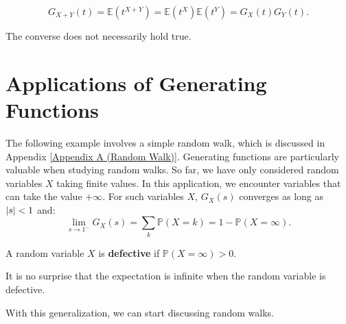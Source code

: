 \documentclass{huhtakm-template-book-v2}
\newcommand{\prob}{\mathbb{P}}
\newcommand{\expect}{\mathbb{E}}
\begin{document}
    \begin{proofing}
        \begin{equation*}
            G_{X+Y}(t) = \expect(t^{X+Y}) = \expect(t^{X})\expect(t^{Y}) = G_{X}(t)G_{Y}(t).
        \end{equation*}
    \end{proofing}
    \begin{rem}
        The converse does not necessarily hold true.
    \end{rem}
    \newpage

\section{Applications of Generating Functions}
    The following example involves a simple random walk, which is discussed in Appendix \ref{Appendix A (Random Walk)}. Generating functions are particularly valuable when studying random walks. So far, we have only considered random variables $X$ taking finite values. In this application, we encounter variables that can take the value $+\infty$. For such variables $X$, $G_{X}(s)$ converges as long as $\left|{s}\right| < 1$ and:
    \begin{equation*}
        \lim_{s \to 1^{-}}G_{X}(s) = \sum_{k}\prob(X = k) = 1-\prob(X = \infty).
    \end{equation*}
    \begin{defn}
        A random variable $X$ is \textbf{defective} if $\prob(X = \infty) > 0$.
    \end{defn}
    \begin{rem}
        It is no surprise that the expectation is infinite when the random variable is defective.
    \end{rem}
    With this generalization, we can start discussing random walks.
\end{document}
